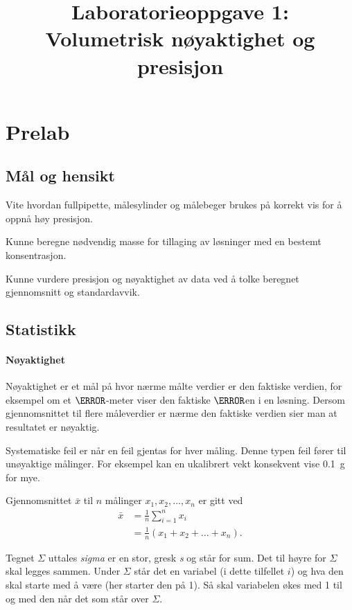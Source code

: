 \documentclass[hidelinks,12pt,norsk,a4paper,fleqn]{scrartcl}
\title{Laboratorieoppgave 1:\\
Volumetrisk nøyaktighet og presisjon}
\author{}
\date{}
\begin{document}
			
	\maketitle
	
	\section{Prelab}
	
	\subsection{Mål og hensikt}
	Vite hvordan fullpipette, målesylinder og målebeger brukes på korrekt vis for å oppnå høy presisjon.
	
	Kunne beregne nødvendig masse for tillaging av løsninger med en bestemt konsentrasjon.
	
	Kunne vurdere presisjon og nøyaktighet av data ved å tolke beregnet gjennomsnitt og standardavvik.
	
	\subsection{Statistikk}
	
	\paragraph{Nøyaktighet}
	Nøyaktighet er et mål på hvor nærme målte verdier er den faktiske verdien, for eksempel om et $\pH$-meter viser den faktiske $\pH$en i en løsning. Dersom gjennomsnittet til flere måleverdier er nærme den faktiske verdien sier man at resultatet er nøyaktig.
	
	Systematiske feil er når en feil gjentas for hver måling. Denne typen feil fører til unøyaktige målinger. For eksempel kan en ukalibrert vekt konsekvent vise \SI{0.1}{g} for mye.
	
	Gjennomsnittet $\bar{x}$ til $n$ målinger $x_1, x_2, \ldots, x_n$ er gitt ved
	\begin{align*}
		\bar{x} &= \frac{1}{n}\sum_{i=1}^{n}x_i\\
		&=\frac{1}{n}\left(x_1 + x_2 + \dots + x_n\right).
	\end{align*}
	
	Tegnet $\Sigma$ uttales \emph{sigma} er en stor, gresk \emph{s} og står for sum. Det til høyre for $\Sigma$ skal legges sammen. Under $\Sigma$ står det en variabel (i dette tilfellet $i$) og hva den skal starte med å være (her starter den på 1). Så skal variabelen økes med 1 til og med den når det som står over $\Sigma$.
	
\end{document}
